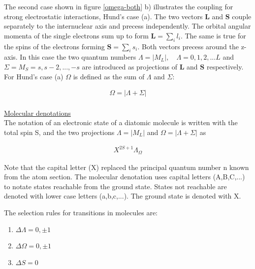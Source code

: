\documentclass[parskip,12pt,headsepline,a4paper] {scrbook}
\begin{document}
The second case shown in figure \ref{omega-both} b) illustrates the coupling for strong electrostatic interactions, Hund's case (a). The two vectors $\boldsymbol{L}$ and $\boldsymbol{S}$ couple separately to the internuclear axis and precess independently. The orbital angular momenta of the single electrons sum up to form $\mathbf{L} = \sum\limits_{i} l_i$. The same is true for the spins of the electrons forming $\mathbf{S} = \sum\limits_{i} s_i$. Both vectors precess around the z-axis. In this case the two quantum numbers $\Lambda = |M_L|,\quad \Lambda = 0, 1, 2,...L$ and $\Sigma = M_S = s, s-2,...,-s$ are introduced as projections of $\boldsymbol{L}$ and $\boldsymbol{S}$ respectively. For Hund's case (a) $\Omega$ is defined as the sum of $\Lambda$ and $\Sigma$:

\begin{align}  \label{omega-ls}
\Omega = |\Lambda + \Sigma|
\end{align}\\


\underline{Molecular denotations} \\
The notation of an electronic state of a diatomic molecule is written with the total spin S, and the two projections $\Lambda = |M_L|$ and $\Omega = |\Lambda + \Sigma|$ as

\begin{align}  \label{mole-denotation}
X^{2S+1}\Lambda_{\Omega}
\end{align}

Note that the capital letter (X) replaced the principal quantum number n known from the atom section. The molecular denotation uses capital letters (A,B,C,...) to notate states reachable from the ground state. States not reachable are denoted with lower case letters (a,b,c,...). The ground state is denoted with X.

The selection rules for transitions in molecules are:

\begin{enumerate}
\item $\Delta \Lambda = 0, \pm 1$
\item $\Delta \Omega = 0, \pm1$
\item $\Delta S = 0$
\end{enumerate}
\end{document}
